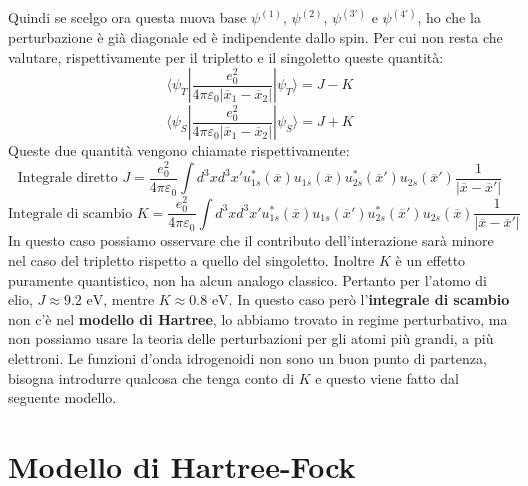 Quindi se scelgo ora questa nuova base $\psi^{(1)}$, $\psi^{(2)}$, $\psi^{(3')}$ e $\psi^{(4')}$, ho che la perturbazione è già diagonale ed è indipendente dallo spin. Per cui non resta che valutare, rispettivamente per il tripletto e il singoletto queste quantità:
\begin{equation*}
    \langle \psi_T|\frac{e_0^2}{4\pi\varepsilon_0|\overline{x}_1-\overline{x}_2|}|\psi_T \rangle = J - K
\end{equation*}
\begin{equation*}
    \langle \psi_S|\frac{e_0^2}{4\pi\varepsilon_0|\overline{x}_1-\overline{x}_2|}|\psi_S \rangle = J + K
\end{equation*}
Queste due quantità vengono chiamate rispettivamente:
\begin{equation*}
    \text{Integrale diretto } J = \frac{e_0^2}{4\pi\varepsilon_0}\int d^3x d^3x'u_{1s}^*(\overline x)u_{1s}(\overline x)u_{2s}^*(\overline{x}')u_{2s}(\overline{x}')\frac{1}{|\overline x - \overline{x}'|}
\end{equation*}
\begin{equation*}
    \text{Integrale di scambio } K = \frac{e_0^2}{4\pi\varepsilon_0}\int d^3x d^3x'u_{1s}^*(\overline x)u_{1s}(\overline{x}')u_{2s}^*(\overline{x}')u_{2s}(\overline{x})\frac{1}{|\overline x - \overline{x}'|}
\end{equation*}
In questo caso possiamo osservare che il contributo dell'interazione sarà minore nel caso del tripletto rispetto a quello del singoletto. Inoltre $K$ è un effetto puramente quantistico, non ha alcun analogo classico.
Pertanto per l'atomo di elio, $J\approx 9.2 \text{ eV}$, mentre $K \approx 0.8 \text{ eV}$. In questo caso però l'\textbf{integrale di scambio} non c'è nel \textbf{modello di Hartree}, lo abbiamo trovato in regime perturbativo, ma non possiamo usare la teoria delle perturbazioni per gli atomi più grandi, a più elettroni. Le funzioni d'onda idrogenoidi non sono un buon punto di partenza, bisogna introdurre qualcosa che tenga conto di $K$ e questo viene fatto dal seguente modello.
\section{Modello di Hartree-Fock}
